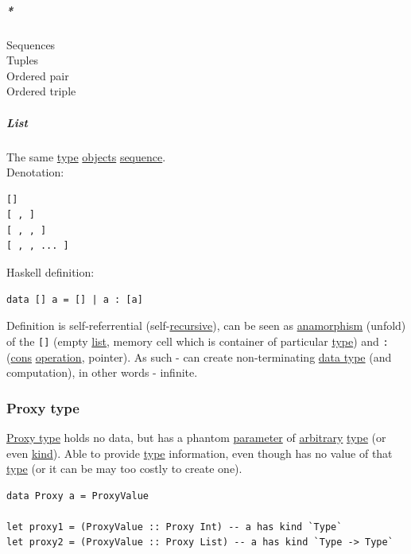 \documentclass[11pt]{article}
\begin{document}
\subparagraph{\emph{*}}
\label{sec:org39dbba1}

\label{orgf15dce2}Sequences\\
\label{org9504f5c}Tuples\\
\label{org1a66b4b}Ordered pair\\
\label{orgecc5f64}Ordered triple\\

\subparagraph{\label{org8ae0f28}List}
\label{sec:orgcdb715e}
The same \hyperref[org4fbaeb8]{type} \hyperref[orge0f000f]{objects} \hyperref[orgf90a45c]{sequence}.\\

Denotation:\\
\begin{verbatim}
[]
[ , ]
[ , , ]
[ , , ... ]
\end{verbatim}

Haskell definition:\\
\begin{verbatim}
data [] a = [] | a : [a]
\end{verbatim}

Definition is self-referrential (self-\hyperref[org06bac4d]{recursive}), can be seen as \hyperref[org3ffaead]{anamorphism} (unfold) of the \texttt{[]} (empty \hyperref[org8ae0f28]{list}, memory cell which is container of particular \hyperref[org4fbaeb8]{type}) and \texttt{:} (\hyperref[org3f167f2]{cons} \hyperref[org87d485b]{operation}, pointer). As such - can create non-terminating \hyperref[org965cde3]{data type} (and computation), in other words - infinite.\\

\subsubsection{\label{org33659fe}Proxy type}
\label{sec:org5bcda95}
\hyperref[org33659fe]{Proxy type} holds no data, but has a phantom \hyperref[org45d4a16]{parameter} of \hyperref[orgbfdf9b7]{arbitrary} \hyperref[org4fbaeb8]{type} (or even \hyperref[org19ec4cb]{kind}). Able to provide \hyperref[org4fbaeb8]{type} information, even though has no value of that \hyperref[org4fbaeb8]{type} (or it can be may too costly to create one).\\
\begin{verbatim}
data Proxy a = ProxyValue

let proxy1 = (ProxyValue :: Proxy Int) -- a has kind `Type`
let proxy2 = (ProxyValue :: Proxy List) -- a has kind `Type -> Type`
\end{verbatim}
\end{document}
